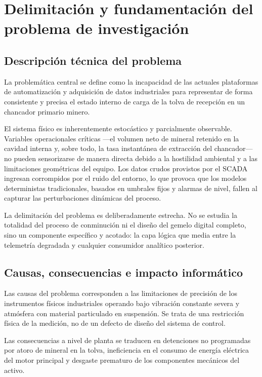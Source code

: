 \section{Delimitación y fundamentación del problema de investigación}
\label{sec:problema}

\subsection{Descripción técnica del problema}

La problemática central se define como la incapacidad de las actuales
plataformas de automatización y adquisición de datos industriales para
representar de forma consistente y precisa el estado interno de carga de la
tolva de recepción en un chancador primario minero.

El sistema físico es inherentemente estocástico y parcialmente observable.
Variables operacionales críticas —el volumen neto de mineral retenido en la
cavidad interna y, sobre todo, la tasa instantánea de extracción del
chancador— no pueden sensorizarse de manera directa debido a la hostilidad
ambiental y a las limitaciones geométricas del equipo. Los datos crudos
provistos por el SCADA ingresan corrompidos por el ruido del entorno, lo que
provoca que los modelos deterministas tradicionales, basados en umbrales fijos y
alarmas de nivel, fallen al capturar las perturbaciones dinámicas del proceso.

La delimitación del problema es deliberadamente estrecha. No se estudia la
totalidad del proceso de conminución ni el diseño del gemelo digital completo,
sino un componente específico y acotado: la capa lógica que media entre la
telemetría degradada y cualquier consumidor analítico posterior.

\subsection{Causas, consecuencias e impacto informático}

Las causas del problema corresponden a las limitaciones de precisión de los
instrumentos físicos industriales operando bajo vibración constante severa y
atmósfera con material particulado en suspensión. Se trata de una restricción
física de la medición, no de un defecto de diseño del sistema de control.

Las consecuencias a nivel de planta se traducen en detenciones no programadas
por atoro de mineral en la tolva, ineficiencia en el consumo de energía
eléctrica del motor principal y desgaste prematuro de los componentes mecánicos
del activo.

